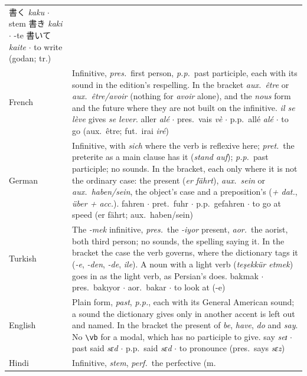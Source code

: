 \documentclass[11pt,oneside]{report}
\newcommand{\jw}[1]{\mbox{\foreignlanguage{japanese}{#1}}}
\newcommand{\fw}[1]{\foreignlanguage{french}{\emph{#1}}}
\newcommand{\gw}[1]{\foreignlanguage{ngerman}{\emph{#1}}}
\newcommand{\tw}[1]{\foreignlanguage{turkish}{\emph{#1}}}
\newcommand{\ipa}[1]{{\ipafont #1}}
\begin{document}
\begin{center}
\begin{longtable}{@{}>{\raggedright\arraybackslash}p{}>{\raggedright\arraybackslash}p{}@{}}
  \jw{書く} \emph{kaku} $\cdot$ stem \jw{書き} \emph{kaki} $\cdot$ -te
  \jw{書いて} \emph{kaite} $\cdot$ to write (godan; tr.) \\
\addlinespace
\textsf{French} & Infinitive, \emph{pres.}\ first person, \emph{p.p.}\ past
  participle, each with its sound in the edition's respelling. In the
  bracket \emph{aux.\ être} or \emph{aux.\ être/avoir} (nothing for
  \fw{avoir} alone), and the \emph{nous} form and the future where they are
  not built on the infinitive. \fw{il se lève} gives \fw{se lever}. \newline
  aller \emph{alé} $\cdot$ pres.\ vais \emph{vè} $\cdot$ p.p.\ allé
  \emph{alé} $\cdot$ to go (aux.\ être; fut.\ irai \emph{iré}) \\
\addlinespace
\textsf{German} & Infinitive, with \gw{sich} where the verb is reflexive
  here; \emph{pret.}\ the preterite as a main clause has it (\gw{stand
  auf}); \emph{p.p.}\ past participle; no sounds. In the bracket, each only
  where it is not the ordinary case: the present (\gw{er fährt}),
  \emph{aux.\ sein} or \emph{aux.\ haben/sein}, the object's case and a
  preposition's (\emph{+ dat.}, \emph{über + acc.}). \newline
  fahren $\cdot$ pret.\ fuhr $\cdot$ p.p.\ gefahren $\cdot$ to go at speed
  (er fährt; aux.\ haben/sein) \\
\addlinespace
\textsf{Turkish} & The \emph{-mek} infinitive, \emph{pres.}\ the
  \emph{-iyor} present, \emph{aor.}\ the aorist, both third person; no
  sounds, the spelling saying it. In the bracket the case the verb governs,
  where the dictionary tags it (\emph{-e}, \emph{-den}, \emph{-de},
  \emph{ile}). A noun with a light verb (\tw{teşekkür etmek}) goes in as the
  light verb, as Persian's does. \newline
  bakmak $\cdot$ pres.\ bakıyor $\cdot$ aor.\ bakar $\cdot$ to look at (-e) \\
\addlinespace
\textsf{English} & Plain form, \emph{past}, \emph{p.p.}, each with its
  General American sound; a sound the dictionary gives only in another
  accent is left out and named. In the bracket the present of \emph{be},
  \emph{have}, \emph{do} and \emph{say}. No \texttt{\textbackslash vb} for a
  modal, which has no participle to give. \newline
  say \emph{\ipa{seɪ}} $\cdot$ past said \emph{\ipa{sɛd}} $\cdot$ p.p.\ said
  \emph{\ipa{sɛd}} $\cdot$ to pronounce (pres.\ says \emph{\ipa{sɛz}}) \\
\addlinespace
\textsf{Hindi} & Infinitive, \emph{stem}, \emph{perf.}\ the perfective (m.\

\end{longtable}
\end{center}
\end{document}
